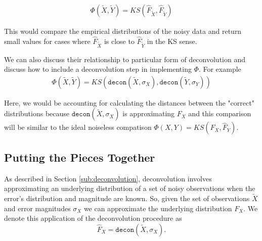 \documentclass[12pt]{article}
\begin{document}
\begin{align*}
    \Phi(\tilde{X}, \tilde{Y}) = KS(\hat{F}_{\tilde{X}}, \hat{F}_{\tilde{Y}})
\end{align*}

This would compare the empirical distributions of the noisy data and return small values for cases where $\hat{F}_{\tilde{X}}$ is close to $\hat{F}_{\tilde{Y}}$ in the KS sense. 

We can also discuss their relationship to particular form of deconvolution and discuss how to include a deconvolution step in implementing $\Phi$. For example 
\begin{align*}
\Phi(\tilde{X}, \tilde{Y}) = KS(\texttt{decon}(\widetilde{X}, \sigma_X), \texttt{decon}(\widetilde{Y}, \sigma_Y))    
\end{align*}

Here, we would be accounting for calculating the distances between the "correct" distributions because $\texttt{decon}(\widetilde{X}, \sigma_X)$ is approximating $F_X$ and this comparison will be similar to the ideal noiseless compatison $\Phi(X, Y) = KS(\hat{F}_X, \hat{F}_Y)$. 



\subsection{Putting the Pieces Together} %
\label{sub:putting_the_pieces_together}

As described in Section \ref{sub:deconvolution}, deconvolution involves approximating an underlying distribution of a set of noisy observations when the error's distribution and magnitude are known. So, given the set of observations $\widetilde{X}$ and error magnitudes $\sigma_X$ we can approximate the underlying distribution $F_X$. We denote this application of the deconvolution procedure as
\begin{equation}
\widehat{F}_X = \texttt{decon}(\widetilde{X}, \sigma_X).
\end{equation}
\end{document}
